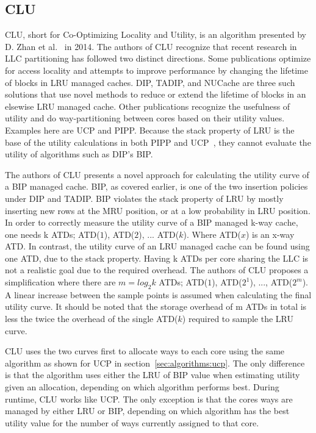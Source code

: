 
\subsection{CLU}
\label{sec:algorithms:clu}

CLU, short for Co-Optimizing Locality and Utility, is an algorithm presented by D. Zhan et al.~\cite{Zhan2014} in 2014.
The authors of CLU recognize that recent research in LLC partitioning has followed two distinct directions.
Some publications optimize for access locality and attempts to improve performance by changing the lifetime of blocks in LRU managed caches.
DIP, TADIP, and NUCache are three such solutions that use novel methods to reduce or extend the lifetime of blocks in an elsewise LRU managed cache.
Other publications recognize the usefulness of utility and do way-partitioning between cores based on their utility values.
Examples here are UCP and PIPP.
Because the stack property of LRU is the base of the utility calculations in both PIPP and UCP~\cite{Qureshi2006, Xie2009}, they cannot evaluate the utility of algorithms such as DIP's BIP.

The authors of CLU presents a novel approach for calculating the utility curve of a BIP managed cache.
BIP, as covered earlier, is one of the two insertion policies under DIP and TADIP. 
BIP violates the stack property of LRU by mostly inserting new rows at the MRU position, or at a low probability in LRU position.
In order to correctly measure the utility curve of a BIP managed k-way cache, one needs k ATDs; ATD($1$), ATD($2$), ... ATD($k$). 
Where ATD($x$) is an x-way ATD.
In contrast, the utility curve of an LRU managed cache can be found using one ATD, due to the stack property.
Having k ATDs per core sharing the LLC is not a realistic goal due to the required overhead.
The authors of CLU proposes a simplification where there are $m = log_2 k$ ATDs; ATD($1$), ATD($2^1$), ..., ATD($2^m$).
A linear increase between the sample points is assumed when calculating the final utility curve.
It should be noted that the storage overhead of m ATDs in total is less the twice the overhead of the single ATD($k$) required to sample the LRU curve.

CLU uses the two curves first to allocate ways to each core using the same algorithm as shown for UCP in section~\ref{sec:algorithms:ucp}.
The only difference is that the algorithm uses either the LRU of BIP value when estimating utility given an allocation, depending on which algorithm performs best.
During runtime, CLU works like UCP.
The only exception is that the cores ways are managed by either LRU or BIP, depending on which algorithm has the best utility value for the number of ways currently assigned to that core.

